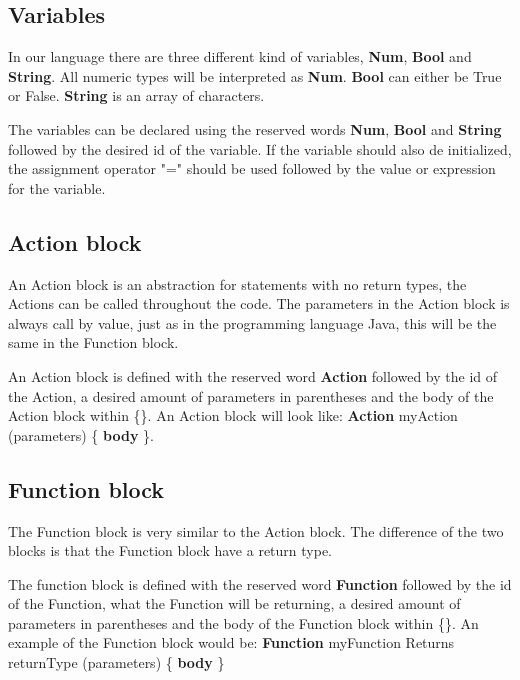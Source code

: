 \subsection{Variables}
In our language there are three different kind of variables, \textbf{Num}, \textbf{Bool} and \textbf{String}. All numeric types will be interpreted as \textbf{Num}. \textbf{Bool} can either be True or False. \textbf{String} is an array of characters.

\begin{defi}
The variables can be declared using the reserved words \textbf{Num}, \textbf{Bool} and \textbf{String} followed by the desired id of the variable. If the variable should also de initialized,  the assignment operator "=" should be used followed by the value or expression for the variable. 
\end{defi}

\subsection{Action block}
An Action block is an abstraction for statements with no return types, the Actions can be called throughout the code. The parameters in the Action block is always call by value, just as in the programming language Java, this will be the same in the Function block.

\begin{defi}
An Action block is defined with the reserved word \textbf{Action} followed by the id of the Action, a desired amount of parameters in parentheses and the body of the Action block within \{\}. \newline
An Action block will look like: \textbf{Action} myAction (parameters) \{ \textbf{body} \}.
\end{defi}

\subsection{Function block}
The Function block is very similar to the Action block. The difference of the two blocks is that the Function block have a return type. 

\begin{defi}
The function block is defined with the reserved word \textbf{Function} followed by the id of the Function, what the Function will be returning, a desired amount of parameters in parentheses and the body of the Function block within \{\}. \newline
An example of the Function block would be: \textbf{Function} myFunction Returns returnType (parameters) \{ \textbf{body} \}
\end{defi}

